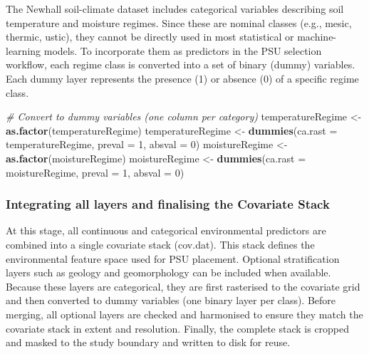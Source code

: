 \documentclass[
  10pt,
  b5paper,
  oneside]{book}
\newenvironment{Shaded}{\begin{snugshade}}{\end{snugshade}}
\newcommand{\AttributeTok}[1]{\textcolor[rgb]{0.13,0.29,0.53}{#1}}
\newcommand{\CommentTok}[1]{\textcolor[rgb]{0.56,0.35,0.01}{\textit{#1}}}
\newcommand{\DecValTok}[1]{\textcolor[rgb]{0.00,0.00,0.81}{#1}}
\newcommand{\FunctionTok}[1]{\textcolor[rgb]{0.13,0.29,0.53}{\textbf{#1}}}
\newcommand{\NormalTok}[1]{#1}
\newcommand{\OtherTok}[1]{\textcolor[rgb]{0.56,0.35,0.01}{#1}}
\begin{document}
The Newhall soil-climate dataset includes categorical variables describing soil temperature and moisture regimes. Since these are nominal classes (e.g., mesic, thermic, ustic), they cannot be directly used in most statistical or machine-learning models. To incorporate them as predictors in the PSU selection workflow, each regime class is converted into a set of binary (dummy) variables. Each dummy layer represents the presence (1) or absence (0) of a specific regime class.

\begin{Shaded}
\begin{Highlighting}[]
\CommentTok{\# Convert to dummy variables (one column per category)}
\NormalTok{temperatureRegime }\OtherTok{\textless{}{-}} \FunctionTok{as.factor}\NormalTok{(temperatureRegime)}
\NormalTok{temperatureRegime }\OtherTok{\textless{}{-}} \FunctionTok{dummies}\NormalTok{(}\AttributeTok{ca.rast =}\NormalTok{ temperatureRegime, }\AttributeTok{preval =} \DecValTok{1}\NormalTok{, }\AttributeTok{absval =} \DecValTok{0}\NormalTok{)}
\NormalTok{moistureRegime }\OtherTok{\textless{}{-}} \FunctionTok{as.factor}\NormalTok{(moistureRegime)}
\NormalTok{moistureRegime }\OtherTok{\textless{}{-}} \FunctionTok{dummies}\NormalTok{(}\AttributeTok{ca.rast =}\NormalTok{ moistureRegime, }\AttributeTok{preval =} \DecValTok{1}\NormalTok{, }\AttributeTok{absval =} \DecValTok{0}\NormalTok{)}
\end{Highlighting}
\end{Shaded}

\subsubsection{Integrating all layers and finalising the Covariate Stack}\label{integrating-all-layers-and-finalising-the-covariate-stack}

At this stage, all continuous and categorical environmental predictors are combined into a single covariate stack (cov.dat). This stack defines the environmental feature space used for PSU placement. Optional stratification layers such as geology and geomorphology can be included when available. Because these layers are categorical, they are first rasterised to the covariate grid and then converted to dummy variables (one binary layer per class). Before merging, all optional layers are checked and harmonised to ensure they match the covariate stack in extent and resolution. Finally, the complete stack is cropped and masked to the study boundary and written to disk for reuse.
\end{document}
